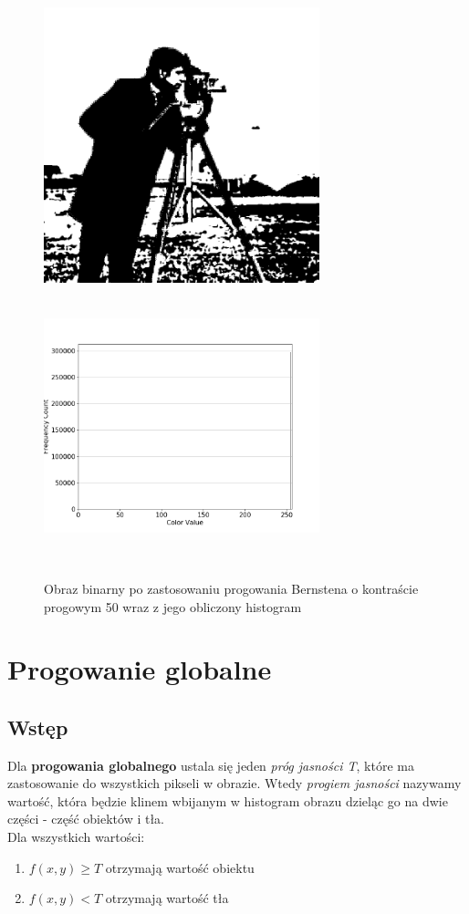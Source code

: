 \documentclass[a4paper,12pt]{book}
\begin{document}
\begin{figure}[H]
	\caption{Obraz binarny po zastosowaniu progowania Bernstena o kontraście progowym 50 wraz z jego obliczony histogram}
	\includegraphics[width=8cm, height=8cm]{5-4/local-threshold-image-photoman-50.png}
	\includegraphics[width=8cm, height=8cm]{5-4/local-threshold-photoman-50.png}
\end{figure}

\section{Progowanie globalne}
\subsection*{Wstęp}
Dla \textbf{progowania globalnego} ustala się jeden \textit{próg jasności T}, które ma zastosowanie do wszystkich pikseli w obrazie. Wtedy \textit{progiem jasności} nazywamy wartość, która będzie klinem wbijanym w histogram obrazu dzieląc go na dwie części - część obiektów i tła. \\
Dla wszystkich wartości: 
\begin{enumerate}
	\item $f(x,y) \geq T$ otrzymają wartość obiektu
	\item $f(x,y) < T$ otrzymają wartość tła
\end{enumerate}
\end{document}
